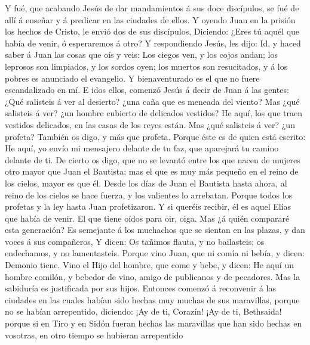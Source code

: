  Y fué, que acabando Jesús de dar mandamientos á sus doce
discípulos, se fué de allí á enseñar y á predicar en las ciudades de
ellos.  Y oyendo Juan en la prisión los hechos de Cristo,
le envió dos de sus discípulos,  Diciendo: ¿Eres tú aquél
que había de venir, ó esperaremos á otro?  Y respondiendo
Jesús, les dijo: Id, y haced saber á Juan las cosas que oís y veis:
 Los ciegos ven, y los cojos andan; los leprosos son
limpiados, y los sordos oyen; los muertos son resucitados, y á los
pobres es anunciado el evangelio.  Y bienaventurado es el
que no fuere escandalizado en mí.  E idos ellos, comenzó
Jesús á decir de Juan á las gentes: ¿Qué salisteis á ver al desierto?
¿una caña que es meneada del viento?  Mas ¿qué salisteis á
ver? ¿un hombre cubierto de delicados vestidos? He aquí, los que traen
vestidos delicados, en las casas de los reyes están.  Mas
¿qué salisteis á ver? ¿un profeta? También os digo, y más que profeta.
 Porque éste es de quien está escrito: He aquí, yo envío
mi mensajero delante de tu faz, que aparejará tu camino delante de ti.
 De cierto os digo, que no se levantó entre los que nacen
de mujeres otro mayor que Juan el Bautista; mas el que es muy más
pequeño en el reino de los cielos, mayor es que él. 
Desde los días de Juan el Bautista hasta ahora, al reino de los cielos
se hace fuerza, y los valientes lo arrebatan.  Porque
todos los profetas y la ley hasta Juan profetizaron.  Y
si queréis recibir, él es aquel Elías que había de venir.
 El que tiene oídos para oir, oiga.  Mas
¿á quién compararé esta generación? Es semejante á los muchachos que se
sientan en las plazas, y dan voces á sus compañeros,  Y
dicen: Os tañimos flauta, y no bailasteis; os endechamos, y no
lamentasteis.  Porque vino Juan, que ni comía ni bebía, y
dicen: Demonio tiene.  Vino el Hijo del hombre, que come
y bebe, y dicen: He aquí un hombre comilón, y bebedor de vino, amigo de
publicanos y de pecadores. Mas la sabiduría es justificada por sus
hijos.  Entonces comenzó á reconvenir á las ciudades en
las cuales habían sido hechas muy muchas de sus maravillas, porque no se
habían arrepentido, diciendo:  ¡Ay de ti, Corazín! ¡Ay de
ti, Bethsaida! porque si en Tiro y en Sidón fueran hechas las maravillas
que han sido hechas en vosotras, en otro tiempo se hubieran arrepentido

